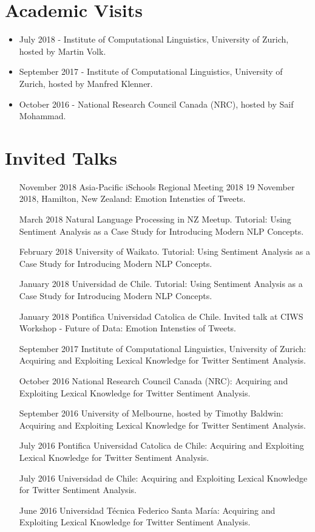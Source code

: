 \documentclass[letterpaper]{article}
\begin{document}
  
\section{Academic Visits}
\begin{itemize}
\item July 2018 - Institute of Computational Linguistics, University of Zurich, hosted by Martin Volk.
\item September 2017 - Institute of Computational Linguistics, University of Zurich, hosted by Manfred Klenner.
\item October 2016 - National Research Council Canada (NRC), hosted by Saif Mohammad.
\end{itemize}  
  

  \section{Invited Talks}
\begin{itemize}
\item [November 2018] Asia-Pacific iSchools Regional Meeting 2018 19 November 2018, Hamilton, New Zealand: Emotion Intensties of Tweets.
\item [March 2018] Natural Language Processing in NZ Meetup. Tutorial: Using Sentiment Analysis as a Case Study for Introducing Modern NLP Concepts.
\item [February 2018] University of Waikato. Tutorial: Using Sentiment Analysis as a Case Study for Introducing Modern NLP Concepts.
\item [January 2018]Universidad de Chile. Tutorial: Using Sentiment Analysis as a Case Study for Introducing Modern NLP Concepts.
\item [January 2018] Pontifica Universidad Catolica de Chile. Invited talk at CIWS Workshop - Future of Data: Emotion Intensties of Tweets.
\item [September 2017] Institute of Computational Linguistics, University of Zurich:  Acquiring and Exploiting Lexical Knowledge for Twitter Sentiment Analysis.
\item [October 2016] National Research Council Canada (NRC):  Acquiring and Exploiting Lexical Knowledge for Twitter Sentiment Analysis.
\item [September 2016] University of Melbourne, hosted by Timothy Baldwin: Acquiring and Exploiting Lexical Knowledge for Twitter Sentiment Analysis.
\item [July 2016] Pontifica Universidad Catolica de Chile:  Acquiring and Exploiting Lexical Knowledge for Twitter Sentiment Analysis.
\item [July 2016] Universidad de Chile:  Acquiring and Exploiting Lexical Knowledge for Twitter Sentiment Analysis.
\item [June 2016] Universidad Técnica Federico Santa María: Acquiring and Exploiting Lexical Knowledge for Twitter Sentiment Analysis. 
\end{itemize}  
  
\end{document}
